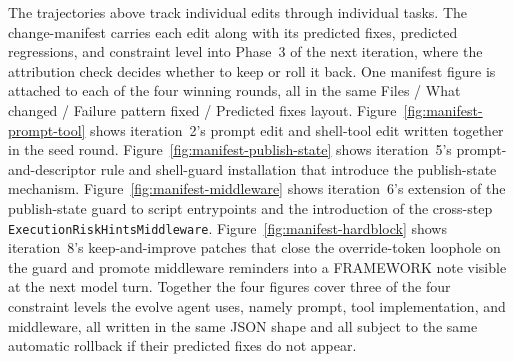 The trajectories above track individual edits through individual tasks. The change-manifest carries each edit along with its predicted fixes, predicted regressions, and constraint level into Phase~3 of the next iteration, where the attribution check decides whether to keep or roll it back. One manifest figure is attached to each of the four winning rounds, all in the same Files / What changed / Failure pattern fixed / Predicted fixes layout. Figure~\ref{fig:manifest-prompt-tool} shows iteration~2's prompt edit and shell-tool edit written together in the seed round. Figure~\ref{fig:manifest-publish-state} shows iteration~5's prompt-and-descriptor rule and shell-guard installation that introduce the publish-state mechanism. Figure~\ref{fig:manifest-middleware} shows iteration~6's extension of the publish-state guard to script entrypoints and the introduction of the cross-step \texttt{ExecutionRiskHintsMiddleware}. Figure~\ref{fig:manifest-hardblock} shows iteration~8's keep-and-improve patches that close the override-token loophole on the guard and promote middleware reminders into a FRAMEWORK note visible at the next model turn. Together the four figures cover three of the four constraint levels the evolve agent uses, namely prompt, tool implementation, and middleware, all written in the same JSON shape and all subject to the same automatic rollback if their predicted fixes do not appear.
